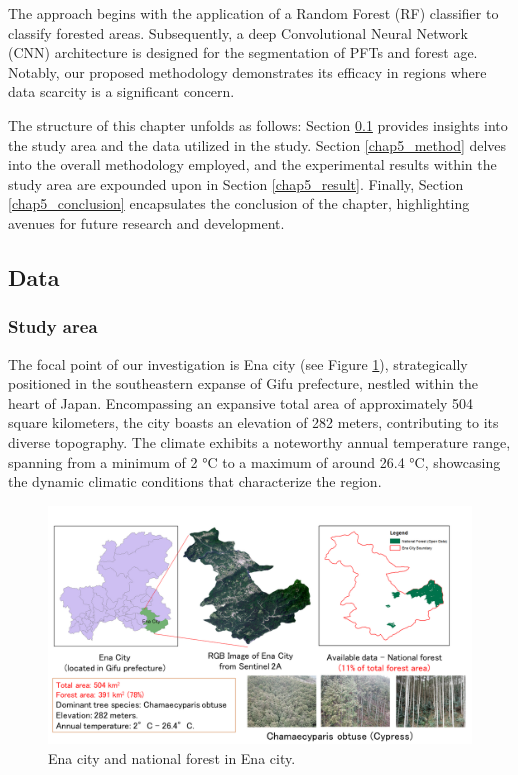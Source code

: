The approach begins with the application of a Random Forest (RF) classifier to classify forested areas. Subsequently, a deep Convolutional Neural Network (CNN) architecture is designed for the segmentation of PFTs and forest age. Notably, our proposed methodology demonstrates its efficacy in regions where data scarcity is a significant concern. \par

The structure of this chapter unfolds as follows: Section \ref{chap5_data} provides insights into the study area and the data utilized in the study. Section \ref{chap5_method} delves into the overall methodology employed, and the experimental results within the study area are expounded upon in Section \ref{chap5_result}. Finally, Section \ref{chap5_conclusion} encapsulates the conclusion of the chapter, highlighting avenues for future research and development. \par

\subsection{Data} \label{chap5_data}
\subsubsection*{Study area}
The focal point of our investigation is Ena city (see Figure \ref{fig:chap5_studyarea}), strategically positioned in the southeastern expanse of Gifu prefecture, nestled within the heart of Japan. Encompassing an expansive total area of approximately 504 square kilometers, the city boasts an elevation of 282 meters, contributing to its diverse topography. The climate exhibits a noteworthy annual temperature range, spanning from a minimum of 2 °C to a maximum of around 26.4 °C, showcasing the dynamic climatic conditions that characterize the region. \par

\begin{figure}[tbh!]
    \centering
    \includegraphics[width=\textwidth]{figs/chap5/study_area_ena.png}
    \caption[National forest in Ena city]{Ena city and national forest in Ena city.}
    \label{fig:chap5_studyarea}
\end{figure}

